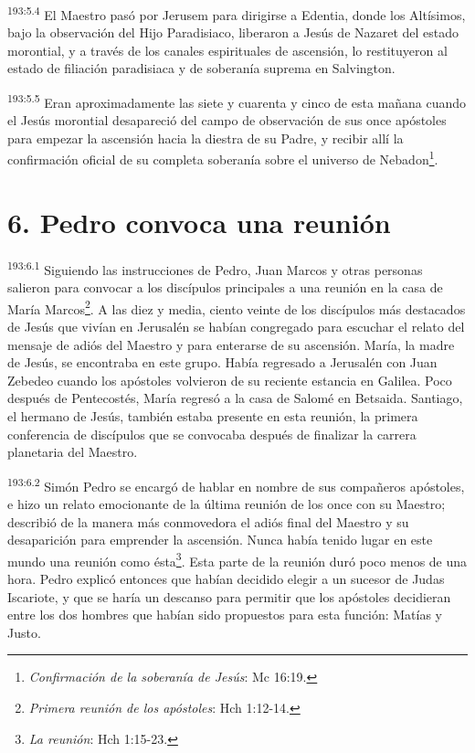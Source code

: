 \par 
\textsuperscript{193:5.4} El Maestro pasó por Jerusem para dirigirse a Edentia, donde los Altísimos, bajo la observación del Hijo Paradisiaco, liberaron a Jesús de Nazaret del estado morontial, y a través de los canales espirituales de ascensión, lo restituyeron al estado de filiación paradisiaca y de soberanía suprema en Salvington.

\par 
\textsuperscript{193:5.5} Eran aproximadamente las siete y cuarenta y cinco de esta mañana cuando el Jesús morontial desapareció del campo de observación de sus once apóstoles para empezar la ascensión hacia la diestra de su Padre, y recibir allí la confirmación oficial de su completa soberanía sobre el universo de Nebadon\footnote{\textit{Confirmación de la soberanía de Jesús}: Mc 16:19.}.

\section*{6. Pedro convoca una reunión}
\par 
\textsuperscript{193:6.1} Siguiendo las instrucciones de Pedro, Juan Marcos y otras personas salieron para convocar a los discípulos principales a una reunión en la casa de María Marcos\footnote{\textit{Primera reunión de los apóstoles}: Hch 1:12-14.}. A las diez y media, ciento veinte de los discípulos más destacados de Jesús que vivían en Jerusalén se habían congregado para escuchar el relato del mensaje de adiós del Maestro y para enterarse de su ascensión. María, la madre de Jesús, se encontraba en este grupo. Había regresado a Jerusalén con Juan Zebedeo cuando los apóstoles volvieron de su reciente estancia en Galilea. Poco después de Pentecostés, María regresó a la casa de Salomé en Betsaida. Santiago, el hermano de Jesús, también estaba presente en esta reunión, la primera conferencia de discípulos que se convocaba después de finalizar la carrera planetaria del Maestro.

\par 
\textsuperscript{193:6.2} Simón Pedro se encargó de hablar en nombre de sus compañeros apóstoles, e hizo un relato emocionante de la última reunión de los once con su Maestro; describió de la manera más conmovedora el adiós final del Maestro y su desaparición para emprender la ascensión. Nunca había tenido lugar en este mundo una reunión como ésta\footnote{\textit{La reunión}: Hch 1:15-23.}. Esta parte de la reunión duró poco menos de una hora. Pedro explicó entonces que habían decidido elegir a un sucesor de Judas Iscariote, y que se haría un descanso para permitir que los apóstoles decidieran entre los dos hombres que habían sido propuestos para esta función: Matías y Justo.

